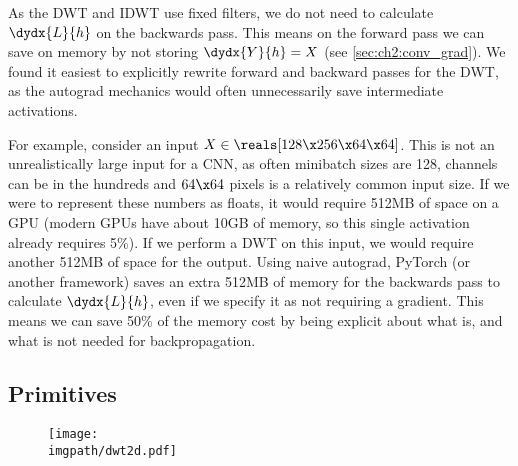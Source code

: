 As the DWT and IDWT use fixed filters, we do not need to calculate
$\dydx{L}{h}$ on the backwards pass. This means on the forward pass we
can save on memory by not storing $\dydx{Y}{h} = X$ (see
\autoref{sec:ch2:conv_grad}). We found it easiest to explicitly rewrite forward
and backward passes for the DWT, as the autograd mechanics would often
unnecessarily save intermediate activations.

For example, consider an input $X \in \reals[128\x 256\x 64\x 64]$. This is not
an unrealistically large input for a CNN, as often minibatch sizes are 128,
channels can be in the hundreds and $64\x 64$ pixels is a relatively common 
input size. If we were to represent these numbers as floats, it would require
512MB of space on a GPU (modern GPUs have about 10GB of memory, so this single
activation already requires 5\%). If we perform a DWT on this input, we would
require another 512MB of space for the output. Using naive autograd, PyTorch
(or another framework) saves an extra 512MB of memory for the backwards pass
to calculate $\dydx{L}{h}$, even if we specify it as not requiring a gradient.
This means we can save 50\% of the memory cost by being explicit about what is,
and what is not needed for backpropagation.



\subsection{Primitives}\label{sec:ch3:primitives}
\begin{figure}
  \centering
  \texttt{[image: \\imgpath/dwt2d.pdf]}
  \label{fig:ch3:dwt}
\end{figure}

